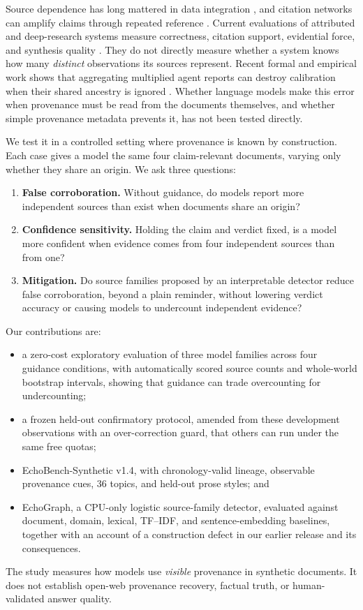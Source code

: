 \documentclass[11pt]{article}
\begin{document}
Source dependence has long mattered in data integration \citep{dong2009dependence}, and citation
networks can amplify claims through repeated reference \citep{greenberg2009citation}. Current
evaluations of attributed and deep-research systems measure correctness, citation support,
evidential force, and synthesis quality \citep{gao2023alce,du2025deepresearch,qian2026force}. They
do not directly measure whether a system knows how many \emph{distinct} observations its sources
represent.
Recent formal and empirical work shows that aggregating multiplied agent reports can destroy
calibration when their shared ancestry is ignored \citep{bara2026sybil}. Whether language models make this error when provenance must be read from the
documents themselves, and whether simple provenance metadata prevents it, has not been tested
directly.

We test it in a controlled setting where provenance is known by construction. Each case gives a
model the same four claim-relevant documents, varying only whether they share an origin. We ask
three questions:
\begin{enumerate}
  \item \textbf{False corroboration.} Without guidance, do models report more independent sources
  than exist when documents share an origin?
  \item \textbf{Confidence sensitivity.} Holding the claim and verdict fixed, is a model more
  confident when evidence comes from four independent sources than from one?
  \item \textbf{Mitigation.} Do source families proposed by an interpretable detector reduce false
  corroboration, beyond a plain reminder, without lowering verdict accuracy or causing models to
  undercount independent evidence?
\end{enumerate}

Our contributions are:
\begin{itemize}
  \item a zero-cost exploratory evaluation of three model families across four guidance
  conditions, with automatically scored source counts and whole-world bootstrap intervals,
  showing that guidance can trade overcounting for undercounting;
  \item a frozen held-out confirmatory protocol, amended from these development observations with
  an over-correction guard, that others can run under the same free quotas;
  \item EchoBench-Synthetic v1.4, with chronology-valid lineage, observable provenance cues,
  36 topics, and held-out prose styles; and
  \item EchoGraph, a CPU-only logistic source-family detector, evaluated against document,
  domain, lexical, TF--IDF, and sentence-embedding baselines, together with an account of a
  construction defect in our earlier release and its consequences.
\end{itemize}
The study measures how models use \emph{visible} provenance in synthetic documents. It does not
establish open-web provenance recovery, factual truth, or human-validated answer quality.
\end{document}
